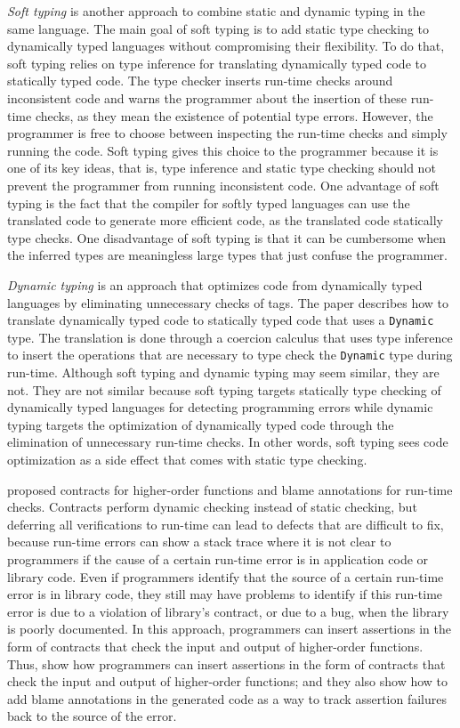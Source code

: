 \documentclass[preprint]{sig-alternate}
\begin{document}
\textit{Soft typing} \citep{cartwright1991soft} is another approach
to combine static and dynamic typing in the same language.
The main goal of soft typing is to add static type checking to
dynamically typed languages without compromising their flexibility.
To do that, soft typing relies on type inference for
translating dynamically typed code to statically typed code.
The type checker inserts run-time checks around inconsistent code and
warns the programmer about the insertion of these run-time checks,
as they mean the existence of potential type errors.
However, the programmer is free to choose between inspecting the
run-time checks and simply running the code.
Soft typing gives this choice to the programmer because it is one of
its key ideas, that is, type inference and static type checking should
not prevent the programmer from running inconsistent code.
One advantage of soft typing is the fact that the compiler for
softly typed languages can use the translated code to generate
more efficient code, as the translated code statically type checks.
One disadvantage of soft typing is that it can be cumbersome when
the inferred types are meaningless large types that just confuse the
programmer.

\textit{Dynamic typing} \citep{henglein1994dts} is an approach
that optimizes code from dynamically typed languages by eliminating
unnecessary checks of tags.
The paper describes how to translate dynamically typed code to
statically typed code that uses a \texttt{Dynamic} type.
The translation is done through a coercion calculus that uses type
inference to insert the operations that are necessary to type check
the \texttt{Dynamic} type during run-time.
Although soft typing and dynamic typing may seem similar, they are not.
They are not similar because soft typing targets statically type
checking of dynamically typed languages for detecting programming
errors while dynamic typing targets the optimization of dynamically
typed code through the elimination of unnecessary run-time checks.
In other words, soft typing sees code optimization as a side effect
that comes with static type checking.

\citet{findler2002chf} proposed contracts for higher-order functions
and blame annotations for run-time checks.
Contracts perform dynamic checking instead of static checking,
but deferring all verifications to run-time can lead to defects
that are difficult to fix, because run-time errors can show a
stack trace where it is not clear to programmers if the cause of a
certain run-time error is in application code or library code.
Even if programmers identify that the source of a certain run-time
error is in library code, they still may have problems to identify
if this run-time error is due to a violation of library's contract,
or due to a bug, when the library is poorly documented.
In this approach, programmers can insert assertions in the form of
contracts that check the input and output of higher-order functions.
Thus, \citet{findler2002chf} show how programmers can insert
assertions in the form of contracts that check the input and output
of higher-order functions; and they also show how to add blame
annotations in the generated code as a way to track assertion
failures back to the source of the error.
\end{document}

